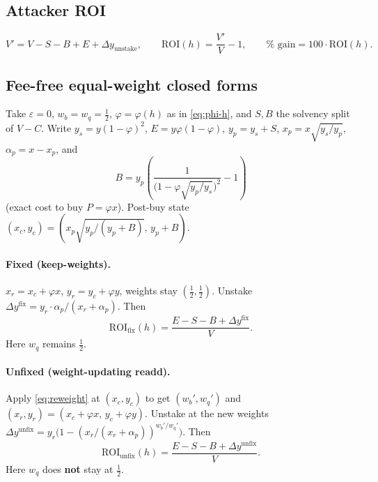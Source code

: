 \documentclass[11pt]{article}
\theoremstyle{definition}
\theoremstyle{remark}
\begin{document}
\subsection{Attacker ROI}
\begin{equation}
\label{eq:roi}
V'=V-S-B+E+\Delta y_{\mathrm{unstake}},
\qquad
\mathrm{ROI}(h)=\frac{V'}{V}-1,
\qquad
\%\text{ gain}=100\cdot\mathrm{ROI}(h).
\end{equation}

\subsection{Fee-free equal-weight closed forms}
\label{sec:cf}
Take $\varepsilon=0$, $w_b=w_q=\tfrac12$, $\varphi=\varphi(h)$ as in
\eqref{eq:phi-h}, and $S,B$ the solvency split of $V-C$. Write
$y_s=y(1-\varphi)^2$, $E=y\varphi(1-\varphi)$,
$y_p=y_s+S$, $x_p=x\sqrt{y_s/y_p}$, $\alpha_p=x-x_p$, and
\begin{equation}
\label{eq:B}
B
=
y_p\left(
\frac{1}{\bigl(1-\varphi\sqrt{y_p/y_s}\bigr)^2}-1
\right)
\end{equation}
(exact cost to buy $P=\varphi x$). Post-buy state
$(x_c,y_c)=(x_p\sqrt{y_p/(y_p+B)},\,y_p+B)$.

\paragraph{Fixed (keep-weights).}
$x_r=x_c+\varphi x$, $y_r=y_c+\varphi y$, weights stay
$(\tfrac12,\tfrac12)$. Unstake
$\Delta y^{\mathrm{fix}}
=y_r\cdot\alpha_p/(x_r+\alpha_p)$.
Then
\begin{equation}
\label{eq:roi-fixed}
\boxed{
\mathrm{ROI}_{\mathrm{fix}}(h)
=
\frac{E-S-B+\Delta y^{\mathrm{fix}}}{V}.
}
\end{equation}
Here $w_q$ remains $\tfrac12$.

\paragraph{Unfixed (weight-updating readd).}
Apply \eqref{eq:reweight} at $(x_c,y_c)$ to get $(w_b',w_q')$ and
$(x_r,y_r)=(x_c+\varphi x,\,y_c+\varphi y)$. Unstake at the new
weights
$\Delta y^{\mathrm{unfix}}
=y_r\bigl(1-(x_r/(x_r+\alpha_p))^{w_b'/w_q'}\bigr)$.
Then
\begin{equation}
\label{eq:roi-unfixed}
\boxed{
\mathrm{ROI}_{\mathrm{unfix}}(h)
=
\frac{E-S-B+\Delta y^{\mathrm{unfix}}}{V}.
}
\end{equation}
Here $w_q$ does \textbf{not} stay at $\tfrac12$.
\end{document}
